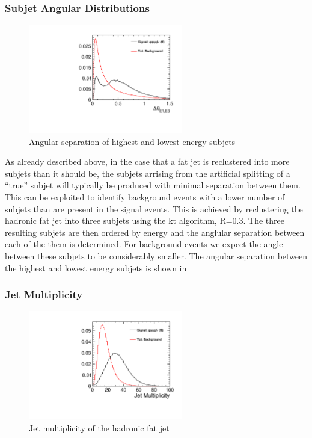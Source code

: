 \subsubsection{Subjet Angular Distributions}
\begin{figure}
  \centering
  \includegraphics[width=0.6\textwidth]{TopAnalysis/figures/HighELowEDira.pdf}
  \caption[Angular separation of highest and lowest energy subjets]{Angular separation of highest and lowest energy subjets}
  \label{fig:angularrelations}
\end{figure}


As already described above, in the case that a fat jet is reclustered into more subjets than it should be, the subjets arrising from the artificial splitting of a ``true'' subjet will typically be produced with minimal separation between them. This can be exploited to identify background events with a lower number of subjets than are present in the signal events. This is achieved by reclustering the hadronic fat jet into three subjets using the kt algorithm, R=0.3. The three resulting subjets are then ordered by energy and the anglular separation between each of the them is determined. For background events we expect the angle between these subjets to be considerably smaller. The angular separation between the highest and lowest energy subjets is shown in 



\subsubsection{Jet Multiplicity}
\label{Jet Multiplicity}

\begin{figure}
  \centering
  \includegraphics[width=0.6\textwidth]{TopAnalysis/figures/JetMultiplicity.pdf}
  \caption[Jet multiplicity of the hadronic fat jet]{Jet multiplicity of the hadronic fat jet}
  \label{fig:multiplicity}
\end{figure}


